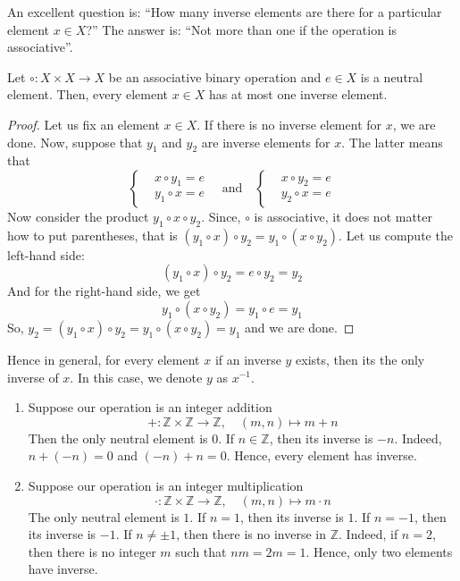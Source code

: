 An excellent question is: ``How many inverse elements are there for a particular element $x\in X$?'' The answer is: ``Not more than one if the operation is associative''.
\begin{claim}
Let $\circ \colon X\times X \to X$ be an associative binary operation and $e\in X$ is a neutral element.
Then, every element $x\in X$ has at most one inverse element.
\end{claim}
\begin{proof}
Let us fix an element $x\in X$.
If there is no inverse element for $x$, we are done.
Now, suppose that $y_1$ and $y_2$ are inverse elements for $x$.
The latter means that
\[
\left\{
\begin{aligned}
&x \circ y_1 = e\\
&y_1 \circ x = e
\end{aligned}
\right.
\quad\text{and}\quad
\left\{
\begin{aligned}
&x \circ y_2 = e\\
&y_2 \circ x = e
\end{aligned}
\right.
\]
Now consider the product $y_1 \circ x \circ y_2$.
Since, $\circ$ is associative, it does not matter how to put parentheses, that is $(y_1 \circ x) \circ y_2 = y_1 \circ (x \circ y_2)$.
Let us compute the left-hand side:
\[
(y_1 \circ x) \circ y_2 = e \circ y_2 = y_2
\]
And for the right-hand side, we get
\[
y_1 \circ (x \circ y_2) = y_1 \circ e = y_1
\]
So, $y_2 = (y_1 \circ x) \circ y_2 = y_1 \circ (x \circ y_2) = y_1$ and we are done.
\end{proof}

Hence in general, for every element $x$ if an inverse $y$ exists, then its the only inverse of $x$.
In this case, we denote $y$ as $x^{-1}$.

\begin{examples}
\begin{enumerate}
\item Suppose our operation is an integer addition
\[
+\colon \mathbb Z\times \mathbb Z\to \mathbb Z,\quad (m,n)\mapsto m+n
\]
Then the only neutral element is $0$.
If $n\in \mathbb Z$, then its inverse is $-n$.
Indeed, $n + (-n) = 0$ and $(-n) + n = 0$.
Hence, every element has inverse.

\item Suppose our operation is an integer multiplication
\[
\cdot\colon \mathbb Z\times \mathbb Z\to \mathbb Z,\quad (m,n)\mapsto m\cdot n
\]
The only neutral element is $	1$.
If $n = 1$, then its inverse is $1$.
If $n = -1$, then its inverse is $-1$.
If $n\neq \pm1$, then there is no inverse in $\mathbb Z$.
Indeed, if $n = 2$, then there is no integer $m$ such that $nm = 2m = 1$.
Hence, only two elements have inverse.
\end{enumerate}
\end{examples}

